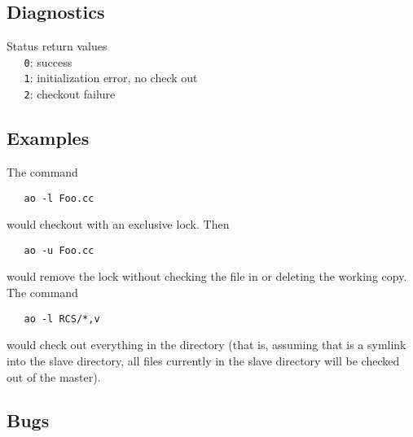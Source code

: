 \subsection*{Diagnostics}

Status return values
\\ \verb+   0+: success
\\ \verb+   1+: initialization error, no check out
\\ \verb+   2+: checkout failure

\subsection*{Examples}

The command

\begin{verbatim}
   ao -l Foo.cc
\end{verbatim}

\noindent
would checkout  with an exclusive lock.  Then

\begin{verbatim}
   ao -u Foo.cc
\end{verbatim}

\noindent
would remove the lock without checking the file in or deleting the working
copy.  The command

\begin{verbatim}
   ao -l RCS/*,v
\end{verbatim}

\noindent
would check out everything in the directory (that is, assuming that 
is a symlink into the slave directory, all files currently in the slave
directory will be checked out of the master).

\subsection*{Bugs}


